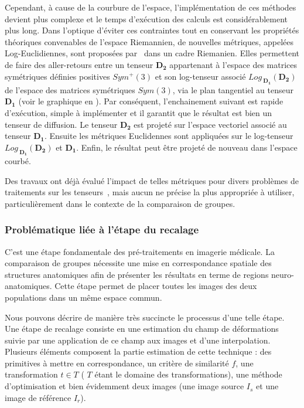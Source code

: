 Cependant, à cause de la courbure de l'espace, l'implémentation de ces méthodes devient plus complexe et le temps d'exécution des calculs est considérablement plus long.
Dans l'optique d'éviter ces contraintes tout en conservant les propriétés théoriques convenables de l'espace Riemannien, 
de nouvelles métriques, appelées Log-Euclidiennes, sont proposées par~\cite{Arsigny2005,Arsigny2006} dans un cadre Riemanien.
Elles permettent de faire des \og aller-retours \fg entre un tenseur $\textbf{D}_\textbf{2}$ appartenant à l'espace des matrices symétriques définies positives $Sym^{+}(3)$ 
et son log-tenseur associé $Log_{\ \textbf{D}_\textbf{1}}(\textbf{D}_\textbf{2})$ de l'espace des matrices symétriques $Sym(3)$,
via le plan tangentiel au tenseur $\textbf{D}_\textbf{1}$ (voir le graphique en ).
Par conséquent, l'enchainement suivant est rapide d'exécution, simple à implémenter et il garantit que le résultat est bien un tenseur de diffusion.
Le tenseur $\textbf{D}_\textbf{2}$ est projeté sur l'espace vectoriel associé au tenseur $\textbf{D}_\textbf{1}$.
Ensuite les métriques Euclidennes sont appliquées sur le log-tenseur $Log_{\ \textbf{D}_\textbf{1}}(\textbf{D}_\textbf{2})$ et $\textbf{D}_\textbf{1}$.
Enfin, le résultat peut être projeté de nouveau dans l'espace courbé.

Des travaux ont déjà évalué l'impact de telles métriques pour divers problèmes de traitements sur les tenseurs~\cite{Arsigny2006,Pasternak2010},
mais aucun ne précise la plus appropriée à utiliser, particulièrement dans le contexte de la comparaison de groupes.
\subsubsection{Problématique liée à l'étape du recalage}
C'est une étape fondamentale des pré-traitements en imagerie médicale. 
La comparaison de groupes nécessite une mise en correspondance spatiale des structures anatomiques afin de présenter les résultats en terme de regions neuro-anatomiques.
Cette étape permet de placer toutes les images des deux populations dans un même espace commun.

Nous pouvons décrire de manière très succincte le processus d'une telle étape.
Une étape de recalage consiste en une estimation du champ de déformations suivie par une application de ce champ aux images et d'une interpolation.
Plusieurs éléments composent la partie estimation de cette technique : des primitives à mettre en correspondance, un critère de similarité $f$, une transformation $t \in T$ ( $T$ étant le domaine des transformations), une méthode d'optimisation et bien évidemment deux images (une image source $I_s$ et une image de référence $I_r$). 

